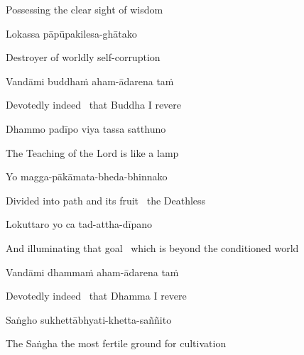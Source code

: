 \begin{english}
  Possessing the clear sight of wisdom
\end{english}

Lokassa pāpūpakilesa-ghātako

\begin{english}
  Destroyer of worldly self-corruption
\end{english}

Vandāmi buddhaṁ aham-ādarena taṁ

\begin{english}
  Devotedly indeed \breathmark\ that Buddha I revere
\end{english}

Dhammo padīpo viya tassa satthuno

\begin{english}
  The Teaching of the Lord is like a lamp\hyperlink{endnote8-appendix}{\hypertarget{endnote8-body}{}}
\end{english}

Yo magga-pākāmata-bheda-bhinnako

\begin{english}
  Divided into path and its fruit \breathmark\ the Deathless\hyperlink{endnote9-appendix}{\hypertarget{endnote9-body}{}}
\end{english}

Lokuttaro yo ca tad-attha-dīpano

\begin{english}
  And illuminating that goal \breathmark\ which is beyond the conditioned world\hyperlink{endnote10-appendix}{\hypertarget{endnote10-body}{}}
\end{english}

Vandāmi dhammaṁ aham-ādarena taṁ

\begin{english}
  Devotedly indeed \breathmark\ that Dhamma I revere
\end{english}

Saṅgho sukhettābhyati-khetta-saññito

\begin{english}
  The Saṅgha the most fertile ground for cultivation
\end{english}

